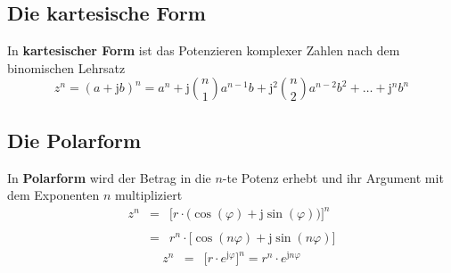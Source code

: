 \subsection{Die kartesische Form}
In \textbf{kartesischer Form} ist das Potenzieren komplexer Zahlen nach dem binomischen Lehrsatz
\begin{equation}
\boxed{z^n=\left(a+\text{j}b\right)^n=a^n+\text{j}\displaystyle \binom{n}{1}a^{n-1}b+\text{j}^2\displaystyle\binom{n}{2}a^{n-2}b^2+\dotso+\text{j}^nb^n}
\end{equation}
\subsection{Die Polarform}
In \textbf{Polarform} wird der Betrag in die $n$-te Potenz erhebt und ihr Argument mit dem Exponenten $n$ multipliziert
\begin{equation}
\boxed{
\begin{array}{lll}
z^n&=&\Big[r\cdot \Big(\cos\left(\varphi\right)+\text{j}\sin\left(\varphi\right)\Big)\Big]^n\\\\
&=&r^n\cdot \Big[\cos\left(n\varphi\right)+\text{j}\sin\left(n\varphi\right)\Big]
\end{array}
}
\end{equation}
\begin{equation}
\boxed{
\begin{array}{lll}
z^n&=&\Big[r\cdot e^{\text{j}\varphi}\Big]^n=r^n\cdot e^{\text{j}n\varphi}
\end{array}
}
\end{equation}
